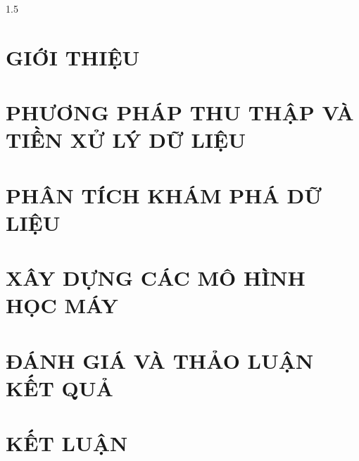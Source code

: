 \documentclass[14pt, a4paper]{report}
\begin{document}
\begin{spacing}{1.5}
\pagestyle{fancy}

\setcounter{tocdepth}{1}
\large

\thispagestyle{empty}
\begin{justify}

\tableofcontents
\thispagestyle{empty}
\clearpage

\chapter{GIỚI THIỆU}
\setcounter{page}{1}


\chapter{PHƯƠNG PHÁP THU THẬP VÀ TIỀN XỬ LÝ DỮ LIỆU}


\chapter{PHÂN TÍCH KHÁM PHÁ DỮ LIỆU}


\chapter{XÂY DỰNG CÁC MÔ HÌNH HỌC MÁY}


\chapter{ĐÁNH GIÁ VÀ THẢO LUẬN KẾT QUẢ}


\chapter{KẾT LUẬN}


\end{justify}
\end{spacing}

\printbibliography
\end{document}
